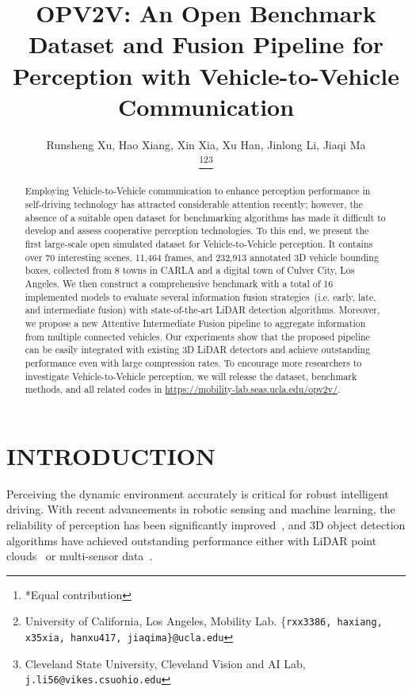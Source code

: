 \documentclass[letterpaper, 10 pt, conference]{ieeeconf}
\title{\LARGE \bf
OPV2V: An Open Benchmark Dataset and Fusion Pipeline for Perception with Vehicle-to-Vehicle Communication}
\author{Runsheng Xu, Hao Xiang, Xin Xia, Xu Han, Jinlong Li, Jiaqi Ma

\thanks{*Equal contribution}\thanks{University of California, Los Angeles, Mobility Lab. {\{\tt\small{rxx3386, haxiang, x35xia, hanxu417, jiaqima}\}}{\tt\small{@ucla.edu}}}\thanks{Cleveland State University, Cleveland Vision and AI Lab,
{\tt\small j.li56@vikes.csuohio.edu}}}
\begin{document}
 \maketitle
\thispagestyle{empty}
\pagestyle{empty}


\begin{abstract}


Employing Vehicle-to-Vehicle communication to enhance perception performance in self-driving technology has attracted considerable attention recently; however, the absence of a suitable open dataset for benchmarking algorithms has made it difficult to develop and assess cooperative perception technologies. To this end, we present the first large-scale open simulated dataset for Vehicle-to-Vehicle perception. It contains over 70 interesting scenes, 11,464 frames, and 232,913 annotated 3D vehicle bounding boxes, collected from 8 towns in CARLA and a digital town of Culver City, Los Angeles. We then construct a comprehensive benchmark with a total of 16 implemented models to evaluate several information fusion strategies~(i.e. early, late, and intermediate fusion) with state-of-the-art LiDAR detection algorithms. Moreover, we propose a new Attentive Intermediate Fusion pipeline to aggregate information from multiple connected vehicles. Our experiments show that the proposed pipeline can be easily integrated with existing 3D LiDAR detectors and achieve outstanding performance even with large compression rates. To encourage more researchers to investigate Vehicle-to-Vehicle perception, we will release the dataset, benchmark methods, and all related codes in 
\textcolor{blue}{\href{https://mobility-lab.seas.ucla.edu/opv2v/}{https://mobility-lab.seas.ucla.edu/opv2v/}}.








\end{abstract}


\section{INTRODUCTION}


Perceiving the dynamic environment accurately is critical for robust intelligent driving. With recent advancements in robotic sensing and machine learning, the reliability of perception has been significantly improved~\cite{liu2019auto, he2016deep, qi2017pointnet}, and 3D object detection algorithms have achieved outstanding performance either with LiDAR point clouds~\cite{voxelnet,pointpillar,Shi_2019_CVPR, Shi2020PVRCNNPF} or multi-sensor data~\cite{Liang2009, Liang2018}. 
\end{document}
